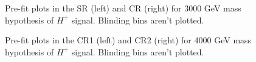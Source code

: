 \begin{figure}[H]
  \centering
  \caption{Pre-fit plots in the SR (left) and CR (right) for 3000 GeV mass hypothesis of $H^{+}$ signal. Blinding bins aren't plotted.}
  \label{fig:Prefit_Hp3000_Blind}
\end{figure}
\begin{figure}[H]
  \centering
  \caption{Pre-fit plots in the CR1 (left) and CR2 (right) for 4000 GeV mass hypothesis of $H^{+}$ signal. Blinding bins aren't plotted.}
  \label{fig:Prefit_Hp4000_Blind}
\end{figure}

